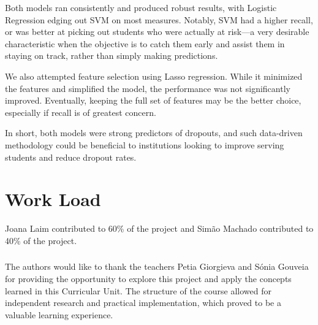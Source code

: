 \documentclass[runningheads]{llncs}
\begin{document}
Both models ran consistently and produced robust results, with Logistic Regression edging out SVM on most measures. Notably, SVM had a higher recall, or was better at picking out students who were actually at risk—a very desirable characteristic when the objective is to catch them early and assist them in staying on track, rather than simply making predictions.

We also attempted feature selection using Lasso regression. While it minimized the features and simplified the model, the performance was not significantly improved. Eventually, keeping the full set of features may be the better choice, especially if recall is of greatest concern.

In short, both models were strong predictors of dropouts, and such data-driven methodology could be beneficial to institutions looking to improve serving students and reduce dropout rates.

\section{Work Load}
Joana Laim contributed to 60\% of the project and Simão Machado contributed to 40\% of the project.


\subsubsection{\ackname} The authors would like to thank the teachers Petia Giorgieva and Sónia Gouveia for providing the opportunity to explore this project and apply the concepts learned in this Curricular Unit. The structure of the course allowed for independent research and practical implementation, which proved to be a valuable learning experience.




\end{document}

